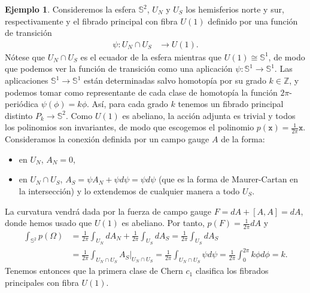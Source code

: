 \documentclass[12pt,a4paper]{article}
\theoremstyle{definition} \newtheorem{defn}[thm]{Definición}
\theoremstyle{definition} \newtheorem{ejemplo}[thm]{Ejemplo}
\theoremstyle{definition} \newtheorem{ejercicio}[thm]{Ejercicio}
\theoremstyle{remark} \newtheorem*{obs}{Observación}
\def\xx{\mathtt{x}}
\def\ZZ{\mathbb{Z}}
\def\SF{\mathbb{S}}
\begin{document}
	   \begin{ejemplo}
	     Consideremos la esfera $\SF^2$, $U_N$ y $U_S$ los hemisferios norte y sur, respectivamente y el fibrado principal con fibra $U(1)$ definido por una función de transición
	     \begin{align*}
	       \psi :U_N\cap U_S&\longrightarrow U(1) .
	       \end{align*}
	       Nótese que $U_N\cap U_S$ es el ecuador de la esfera mientras que $U(1)\cong \SF^1$, de modo que podemos ver la función de transición como una aplicación $\psi:\SF^1 \rightarrow \SF^1$. Las aplicaciones $\SF^1\rightarrow \SF^1$ están determinadas salvo homotopía por su grado $k\in \ZZ$, y podemos tomar como representante de cada clase de homotopía la función $2\pi$-periódica $\psi(\phi)= k\phi$. Así, para cada grado $k$ tenemos un fibrado principal distinto $P_k\rightarrow \SF^2$. Como $U(1)$ es abeliano, la acción adjunta es trivial y todos los polinomios son invariantes, de modo que escogemos el polinomio $p(\xx)=\frac{1}{2\pi}\xx$. Consideramos la conexión definida por un campo gauge $A$ de la forma:
	       \begin{itemize}
		 \item en $U_N$, $A_N=0$,
		 \item en $U_N\cap U_S$,  $A_S=\psi A_N + \psi d\psi=\psi d\psi$ (que es la forma de Maurer-Cartan en la intersección) y lo extendemos de cualquier manera a todo $U_S$.
	       \end{itemize}
	       La curvatura vendrá dada por la fuerza de campo gauge $F=dA+[A,A]=dA$, donde hemos usado que $U(1)$ es abeliano. Por tanto, $p(F)=\frac{1}{2\pi}dA$ y
	       \begin{align*}
		 \int_{\SF^2} p(\Omega)&=\frac{1}{2\pi} \int_{U_N}dA_N+\frac{1}{2\pi}\int_{U_S}dA_S=\frac{1}{2\pi}\int_{U_S}dA_S\\ &=\frac{1}{2\pi}\int_{U_N\cap U_S}A_S|_{U_N\cap U_S}=\frac{1}{2\pi}\int_{U_N\cap U_S}\psi d\psi= \frac{1}{2\pi} \int_0^{2\pi} k\phi d\phi = k.
	       \end{align*}
	       Tenemos entonces que la primera clase de Chern $c_1$ clasifica los fibrados principales con fibra $U(1)$.
	   \end{ejemplo}

	   \appendix
\end{document}

